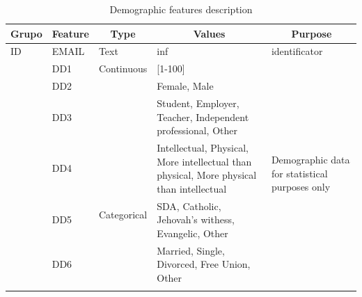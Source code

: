 \documentclass[]{book}
\begin{document}
\begin{table}[ht]
    \centering
    \caption{Demographic features description}
    \label{tab:demographic-feature-description}
    \begin{tabular}{|l|l|l|p{5cm}|p{4cm}|}
        \hline
        \multicolumn{1}{|c|}{\textbf{Grupo}} & \multicolumn{1}{c|}{\textbf{Feature}} & \multicolumn{1}{c|}{\textbf{Type}} & \multicolumn{1}{c|}{\textbf{Values}}                                                     & \multicolumn{1}{c|}{\textbf{Purpose}}                              \\ \hline
        ID                                   & EMAIL                                 & Text                               & inf                                                                                      & identificator                                                   \\ \hline
        \multirow{8}{*}{}         & DD1                                   & Continuous                         & {[}1-100{]}                                                                              & \multirow{6}{4cm}{Demographic data for statistical purposes only} \\ \cline{2-4}
        & DD2                                   &        & Female, Male                                                                             &                                                                 \\ \cline{2-2} \cline{4-4} 
        & DD3                                   &                                    & Student, Employer, Teacher, Independent professional, Other                              &                                                                 \\ \cline{2-2} \cline{4-4}
        & DD4                                   & \multirow{6}{*}{Categorical}                                  & Intellectual, Physical, More intellectual than physical, More physical than intellectual &                                                                 \\ \cline{2-2} \cline{4-4} {Demographic}
        & DD5                                   &                                    & SDA, Catholic, Jehovah's withess, Evangelic, Other                                       &                                       \\ \cline{2-2} \cline{4-4} 
        & DD6                                   &                                    & Married, Single, Divorced, Free Union, Other                                             &                                                                 \\ \cline{2-2} \cline{4-5} 

\end{tabular}
\end{table}
\end{document}
